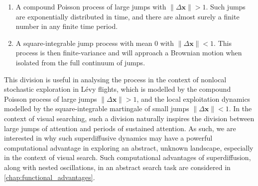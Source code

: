 \begin{enumerate}
	\item A compound Poisson process of large jumps with $\| \Delta \textbf{x} \| > 1$. Such jumps are exponentially distributed in time, and there are almost surely a finite number in any finite time period.
	\item A square-integrable jump process with mean 0 with  $\| \Delta \textbf{x} \| < 1$. This process is then finite-variance and will approach a Brownian motion when isolated from the full continuum of jumps.
\end{enumerate}
This division is useful in analysing the process in the context of nonlocal stochastic exploration in Lévy flights, which is modelled by the compound Poisson process of large jumps $\|\Delta \mathbf{x}\| > 1$, and the local exploitation dynamics modelled by the square-integrable martingale of small jumps $\|\Delta \textbf{x}\| < 1$. In the context of visual searching, such a division naturally inspires the division between large jumps of attention and periods of sustained attention. As such, we are interested in why such superdiffusive dynamics may have a powerful computational advantage in exploring an abstract, unknown landscape, especially in the context of visual search. Such computational advantages of superdiffusion, along with nested oscillations, in an abstract search task are considered in \cref{chap:functional_advantages}.

